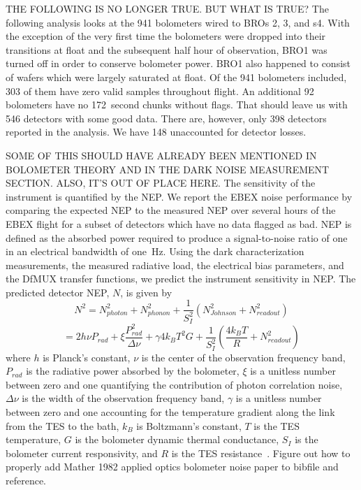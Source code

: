THE FOLLOWING IS NO LONGER TRUE. BUT WHAT IS TRUE?
The following analysis looks at the 941 bolometers wired to \ac{BRO}s 2, 3, and s4. 
With the exception of the very first time the bolometers were dropped into their transitions at float and the subsequent half hour of observation, \ac{BRO}1 was turned off in order to conserve bolometer power. \ac{BRO}1 also happened to consist of wafers which were largely saturated at float. 
Of the 941 bolometers included, 303 of them have zero valid samples throughout flight. 
An additional 92 bolometers have no 172~second chunks without flags. 
That should leave us with 546 detectors with some good data. 
There are, however, only 398 detectors reported in the analysis. 
We have 148 unaccounted for detector losses. 

SOME OF THIS SHOULD HAVE ALREADY BEEN MENTIONED IN BOLOMETER THEORY AND IN THE DARK NOISE MEASUREMENT SECTION. ALSO, IT'S OUT OF PLACE HERE.
The sensitivity of the instrument is quantified by the \ac{NEP}. 
We report the \ac{EBEX} noise performance by comparing the expected \ac{NEP} to the measured \ac{NEP} over several hours of the \ac{EBEX} flight for a subset of detectors which have no data flagged as bad. 
\ac{NEP} is defined as the absorbed power required to produce a signal-to-noise ratio of one in an electrical bandwidth of one~Hz. 
Using the dark characterization measurements, the measured radiative load, the electrical bias parameters, and the \ac{DfMUX} transfer functions, we predict the instrument sensitivity in \ac{NEP}. 
The predicted detector \ac{NEP}, $N$, is given by 
\begin{equation}
N^{2} = N_{photon}^2 + N_{phonon}^2 + \frac{1}{S_I^2} ( N_{Johnson}^2 + N_{readout}^2 )
\end{equation}
\begin{equation}
= 2h\nu P_{rad} + \xi \frac{P_{rad}^2}{\Delta \nu} + \gamma 4k_{B} T^2 G + \frac{1}{S_I^2} (\frac{4k_BT}{R} + N_{readout}^2 )
\label{eq:nep}
\end{equation}
where $h$ is Planck's constant, $\nu$ is the center of the observation frequency band, $P_{rad}$ is the radiative power absorbed by the bolometer, $\xi$ is a unitless number between zero and one quantifying the contribution of photon correlation noise, $\Delta \nu$ is the width of the observation frequency band, $\gamma$ is a unitless number between zero and one accounting for the temperature gradient along the link from the \ac{TES} to the bath, $k_{B}$ is Boltzmann's constant, $T$ is the \ac{TES} temperature, $G$ is the bolometer dynamic thermal conductance, $S_{I}$ is the bolometer current responsivity, and $R$ is the \ac{TES} resistance~\citep{Mather1982a}. 
Figure out how to properly add Mather 1982 applied optics bolometer noise paper to bibfile and reference.



